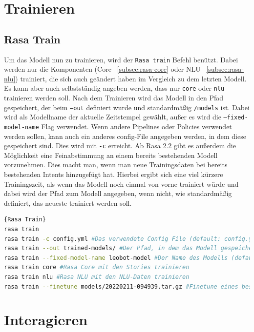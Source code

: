 \section{Trainieren}\label{section:train}

\subsection{Rasa Train}\label{subsec:rasa-train}

Um das Modell nun zu trainieren, wird der \texttt{Rasa train} Befehl benützt.
Dabei werden nur die Komponenten (Core ~\ref{subsec:rasa-core} oder NLU ~\ref{subsec:rasa-nlu}) trainiert, die sich auch geändert haben im Vergleich zu dem letzten Modell.
Es kann aber auch selbstständig angeben werden, dass nur \texttt{core} oder \texttt{nlu} trainieren werden soll.
Nach dem Trainieren wird das Modell in den Pfad gespeichert, der beim \texttt{--out} definiert wurde und standardmäßig \texttt{/models} ist.
Dabei wird als Modellname der aktuelle Zeitstempel gewählt, außer es wird die \texttt{--fixed-model-name} Flag verwendet.
Wenn andere Pipelines oder Policies verwendet werden sollen, kann auch ein anderes config-File angegeben werden, in dem diese gespeichert sind.
Dies wird mit \texttt{-c} erreicht.
Ab Rasa 2.2 gibt es außerdem die Möglichkeit eine Feinabstimmung an einem bereits bestehenden Modell vorzunehmen.
Dies macht man, wenn man neue Trainingsdaten bei bereits bestehenden Intents hinzugefügt hat.
Hierbei ergibt sich eine viel kürzere Trainingszeit, als wenn das Modell noch einmal von vorne trainiert würde und dabei wird der Pfad zum Modell angegeben, wenn nicht, wie standardmäßig definiert, das neueste trainiert werden soll.\cite{rasaTrain}

\begin{lstlisting}[language=bash,label={lst:rasa-train},caption={Rasa Train Befehle}]{Rasa Train}
rasa train
rasa train -c config.yml #Das verwendete Config File (default: config.yml)
rasa train --out trained-models/ #Der Pfad, in dem das Modell gespeichert wird (default: models/)
rasa train --fixed-model-name leobot-model #Der Name des Modells (default: <timestamp>.tar.gz)
rasa train core #Rasa Core mit den Stories trainieren
rasa train nlu #Rasa NLU mit den NLU-Daten trainieren
rasa train --finetune models/20220211-094939.tar.gz #Finetune eines bestehenden Modells
\end{lstlisting}


\section{Interagieren}\label{sec:interact}

